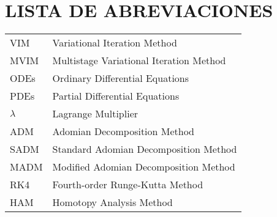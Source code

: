 \chapter*{LISTA DE ABREVIACIONES}

\begin{center}
\begin{tabular}{ll}
VIM         &\hspace{2cm} Variational Iteration Method            \\
MVIM        &\hspace{2cm} Multistage Variational Iteration Method \\
ODEs        &\hspace{2cm} Ordinary Differential Equations         \\
PDEs        &\hspace{2cm} Partial Differential Equations          \\
$\lambda$   &\hspace{2cm} Lagrange Multiplier                     \\
ADM         &\hspace{2cm} Adomian Decomposition Method            \\
SADM        &\hspace{2cm} Standard Adomian Decomposition Method   \\
MADM        &\hspace{2cm} Modified Adomian Decomposition Method   \\
RK4         &\hspace{2cm} Fourth-order Runge-Kutta Method         \\
HAM         &\hspace{2cm} Homotopy Analysis Method                \\
\end{tabular}
\end{center}
\clearpage
